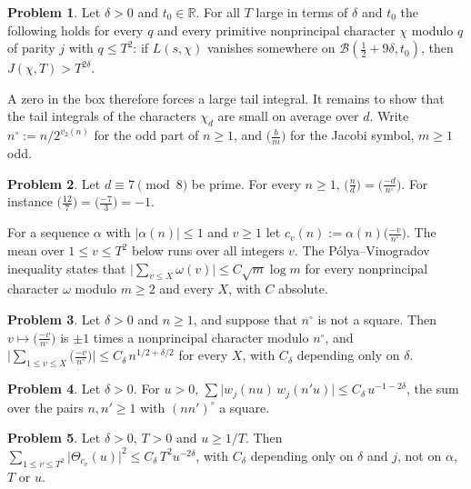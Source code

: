 \documentclass[reqno]{amsart}
\theoremstyle{definition}
\newtheorem{problem}{Problem}[section]
\theoremstyle{plain}
\theoremstyle{remark}
\newcommand{\R}{\mathbb{R}}
\newcommand{\leg}[2]{\bigl(\tfrac{#1}{#2}\bigr)}
\newcommand{\Bx}{\mathcal{B}}
\begin{document}
\begin{problem}\label{pr:zero-forces}
Let $\delta > 0$ and $t_0 \in \R$.  For all $T$ large in terms of $\delta$ and $t_0$ the following holds for every $q$ and every primitive nonprincipal character $\chi$ modulo $q$ of parity $j$ with $q \le T^2$: if $L(s, \chi)$ vanishes somewhere on $\Bx(\frac12 + 9\delta, t_0)$, then $J(\chi, T) > T^{2\delta}$.
\end{problem}

A zero in the box therefore forces a large tail integral.  It remains to show that the tail integrals of the characters $\chi_d$ are small on average over $d$.  Write $n^\circ := n/2^{v_2(n)}$ for the odd part of $n \ge 1$, and $\leg{b}{m}$ for the Jacobi symbol, $m \ge 1$ odd.

\begin{problem}\label{pr:recip-d}
Let $d \equiv 7 \pmod 8$ be prime.  For every $n \ge 1$, $\leg{n}{d} = \leg{-d}{n^\circ}$.  For instance $\leg{12}{7} = \leg{-7}{3} = -1$.
\end{problem}

For a sequence $\alpha$ with $\lvert \alpha(n) \rvert \le 1$ and $v \ge 1$ let $c_v(n) := \alpha(n) \leg{-v}{n^\circ}$.  The mean over $1 \le v \le T^2$ below runs over all integers $v$.  The P\'olya--Vinogradov inequality \cite[Ch.~23]{Dav} states that $\lvert \sum_{v \le X} \omega(v) \rvert \le C \sqrt{m} \log m$ for every nonprincipal character $\omega$ modulo $m \ge 2$ and every $X$, with $C$ absolute.

\begin{problem}\label{pr:pv-jacobi}
Let $\delta > 0$ and $n \ge 1$, and suppose that $n^\circ$ is not a square.  Then $v \mapsto \leg{-v}{n^\circ}$ is $\pm 1$ times a nonprincipal character modulo $n^\circ$, and $\bigl\lvert \sum_{1 \le v \le X} \leg{-v}{n^\circ} \bigr\rvert \le C_\delta\, n^{1/2 + \delta/2}$ for every $X$, with $C_\delta$ depending only on $\delta$.
\end{problem}

\begin{problem}\label{pr:square-pairs}
Let $\delta > 0$.  For $u > 0$, $\sum \lvert w_j(n u)\, w_j(n' u) \rvert \le C_\delta\, u^{-1 - 2\delta}$, the sum over the pairs $n, n' \ge 1$ with $(n n')^\circ$ a square.
\end{problem}

\begin{problem}\label{pr:mean-square}
Let $\delta > 0$, $T > 0$ and $u \ge 1/T$.  Then $\sum_{1 \le v \le T^2} \lvert \Theta_{c_v}(u) \rvert^2 \le C_\delta\, T^2 u^{-2\delta}$, with $C_\delta$ depending only on $\delta$ and $j$, not on $\alpha$, $T$ or $u$.
\end{problem}
\end{document}
